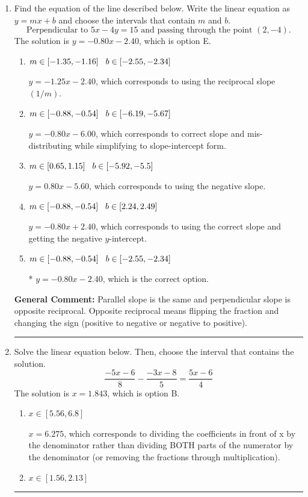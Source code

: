\documentclass{extbook}[14pt]
\newcommand{\litem}[1]{\item #1

\rule{\textwidth}{0.4pt}}
\begin{document}
\begin{enumerate}\litem{
Find the equation of the line described below. Write the linear equation as $ y=mx+b $ and choose the intervals that contain $m$ and $b$.
\[ \text{Perpendicular to } 5 x - 4 y = 15 \text{ and passing through the point } (2, -4). \]The solution is \( y = -0.80x - 2.40 \), which is option E.\begin{enumerate}[label=\Alph*.]
\item \( m \in [-1.35, -1.16] \hspace*{3mm} b \in [-2.55, -2.34] \)

 $y = -1.25x - 2.40$, which corresponds to using the reciprocal slope $(1/m)$.
\item \( m \in [-0.88, -0.54] \hspace*{3mm} b \in [-6.19, -5.67] \)

 $y = -0.80x - 6.00$, which corresponds to correct slope and mis-distributing while simplifying to slope-intercept form.
\item \( m \in [0.65, 1.15] \hspace*{3mm} b \in [-5.92, -5.5] \)

 $y = 0.80x - 5.60$, which corresponds to using the negative slope.
\item \( m \in [-0.88, -0.54] \hspace*{3mm} b \in [2.24, 2.49] \)

 $y = -0.80x + 2.40$, which corresponds to using the correct slope and getting the negative $y$-intercept.
\item \( m \in [-0.88, -0.54] \hspace*{3mm} b \in [-2.55, -2.34] \)

* $y = -0.80x - 2.40$, which is the correct option.
\end{enumerate}

\textbf{General Comment:} Parallel slope is the same and perpendicular slope is opposite reciprocal. Opposite reciprocal means flipping the fraction and changing the sign (positive to negative or negative to positive).
}
\litem{
Solve the linear equation below. Then, choose the interval that contains the solution.
\[ \frac{-5x -6}{8} - \frac{-3x -8}{5} = \frac{5x -6}{4} \]The solution is \( x = 1.843 \), which is option B.\begin{enumerate}[label=\Alph*.]
\item \( x \in [5.56, 6.8] \)

 $x = 6.275$, which corresponds to dividing the coefficients in front of x by the denominator rather than dividing BOTH parts of the numerator by the denominator (or removing the fractions through multiplication).
\item \( x \in [1.56, 2.13] \)


\end{enumerate}}
\end{enumerate}
\end{document}

